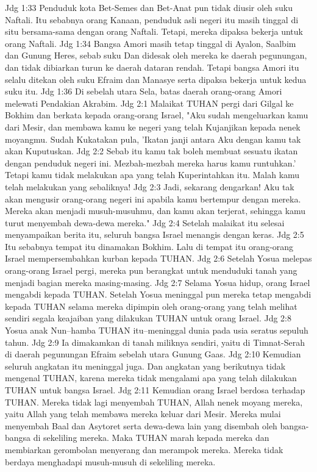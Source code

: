 Jdg 1:33  Penduduk kota Bet-Semes dan Bet-Anat pun tidak diusir oleh suku Naftali. Itu sebabnya orang Kanaan, penduduk asli negeri itu masih tinggal di situ bersama-sama dengan orang Naftali. Tetapi, mereka dipaksa bekerja untuk orang Naftali.
Jdg 1:34  Bangsa Amori masih tetap tinggal di Ayalon, Saalbim dan Gunung Heres, sebab suku Dan didesak oleh mereka ke daerah pegunungan, dan tidak dibiarkan turun ke daerah dataran rendah. Tetapi bangsa Amori itu selalu ditekan oleh suku Efraim dan Manasye serta dipaksa bekerja untuk kedua suku itu.
Jdg 1:36  Di sebelah utara Sela, batas daerah orang-orang Amori melewati Pendakian Akrabim.
Jdg 2:1  Malaikat TUHAN pergi dari Gilgal ke Bokhim dan berkata kepada orang-orang Israel, "Aku sudah mengeluarkan kamu dari Mesir, dan membawa kamu ke negeri yang telah Kujanjikan kepada nenek moyangmu. Sudah Kukatakan pula, 'Ikatan janji antara Aku dengan kamu tak akan Kuputuskan.
Jdg 2:2  Sebab itu kamu tak boleh membuat sesuatu ikatan dengan penduduk negeri ini. Mezbah-mezbah mereka harus kamu runtuhkan.' Tetapi kamu tidak melakukan apa yang telah Kuperintahkan itu. Malah kamu telah melakukan yang sebaliknya!
Jdg 2:3  Jadi, sekarang dengarkan! Aku tak akan mengusir orang-orang negeri ini apabila kamu bertempur dengan mereka. Mereka akan menjadi musuh-musuhmu, dan kamu akan terjerat, sehingga kamu turut menyembah dewa-dewa mereka."
Jdg 2:4  Setelah malaikat itu selesai menyampaikan berita itu, seluruh bangsa Israel menangis dengan keras.
Jdg 2:5  Itu sebabnya tempat itu dinamakan Bokhim. Lalu di tempat itu orang-orang Israel mempersembahkan kurban kepada TUHAN.
Jdg 2:6  Setelah Yosua melepas orang-orang Israel pergi, mereka pun berangkat untuk menduduki tanah yang menjadi bagian mereka masing-masing.
Jdg 2:7  Selama Yosua hidup, orang Israel mengabdi kepada TUHAN. Setelah Yosua meninggal pun mereka tetap mengabdi kepada TUHAN selama mereka dipimpin oleh orang-orang yang telah melihat sendiri segala keajaiban yang dilakukan TUHAN untuk orang Israel.
Jdg 2:8  Yosua anak Nun--hamba TUHAN itu--meninggal dunia pada usia seratus sepuluh tahun.
Jdg 2:9  Ia dimakamkan di tanah miliknya sendiri, yaitu di Timnat-Serah di daerah pegunungan Efraim sebelah utara Gunung Gaas.
Jdg 2:10  Kemudian seluruh angkatan itu meninggal juga. Dan angkatan yang berikutnya tidak mengenal TUHAN, karena mereka tidak mengalami apa yang telah dilakukan TUHAN untuk bangsa Israel.
Jdg 2:11  Kemudian orang Israel berdosa terhadap TUHAN. Mereka tidak lagi menyembah TUHAN, Allah nenek moyang mereka, yaitu Allah yang telah membawa mereka keluar dari Mesir. Mereka mulai menyembah Baal dan Asytoret serta dewa-dewa lain yang disembah oleh bangsa-bangsa di sekeliling mereka. Maka TUHAN marah kepada mereka dan membiarkan gerombolan menyerang dan merampok mereka. Mereka tidak berdaya menghadapi musuh-musuh di sekeliling mereka.
